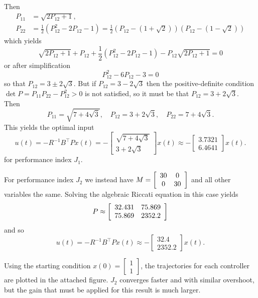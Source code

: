 \documentclass{article}
\begin{document}
Then
\begin{align*}
P_{11} &= \sqrt{2 P_{12} + 1}, \\
P_{22} &= \frac{1}{2} (P_{12}^2 - 2 P_{12} - 1)
       = \frac{1}{2} (P_{12} - (1 + \sqrt{2}))(P_{12} - (1 - \sqrt{2}))
\end{align*}
which yields
$$
\sqrt{2 P_{12} + 1}
+ P_{12}
+ \frac{1}{2}(P_{12}^2 - 2P_{12} - 1)
- P_{12} \sqrt{2 P_{12} + 1} = 0
$$
or after simplification
$$
P_{12}^2 - 6P_{12} - 3 = 0
$$
so that $P_{12} = 3 \pm 2 \sqrt{3}$. But if
$P_{12} = 3 - 2\sqrt{3}$ then the positive-definite condition
$\det P = P_{11} P_{22} - P_{12}^2 > 0$ is not satisfied, so it must
be that $P_{12} = 3 + 2 \sqrt{3}$. Then
$$
P_{11} = \sqrt{7 + 4\sqrt{3}}, \quad
P_{12} = 3 + 2\sqrt{3}, \quad
P_{22} = 7 + 4\sqrt{3}.
$$
This yields the optimal input
$$
u(t)
 = -R^{-1} B^\top P x(t)
 = -\left[\begin{array}{c}
      \sqrt{7 + 4\sqrt{3}} \\
      3 + 2 \sqrt{3}
    \end{array}\right] x(t)
 \approx
   -\left[\begin{array}{c}
       3.7321 \\
       6.4641
    \end{array}\right] x(t).
$$
for performance index $J_1$.

For performance index $J_2$ we instead have
$M = \left[\begin{array}{c c}
       30 &  0 \\
       0  & 30
     \end{array}\right]$
and all other variables the same. Solving the algebraic Riccati
equation in this case yields
$$
P \approx
  \left[\begin{array}{c c}
    32.431 & 75.869 \\
    75.869 & 2352.2
  \end{array}\right]
$$
and so
$$
u(t)
 = -R^{-1} B^\top P x(t)
 \approx
   -\left[\begin{array}{c}
        32.4 \\
      2352.2
    \end{array}\right] x(t).
$$

Using the starting condition
$x(0) = \left[\begin{array}{c}
          1 \\ 1
        \end{array}\right]$, the trajectories for each controller are
plotted in the attached figure. $J_2$ converges faster and
with similar overshoot, but the gain that must be applied for this
result is much larger.
\end{document}
